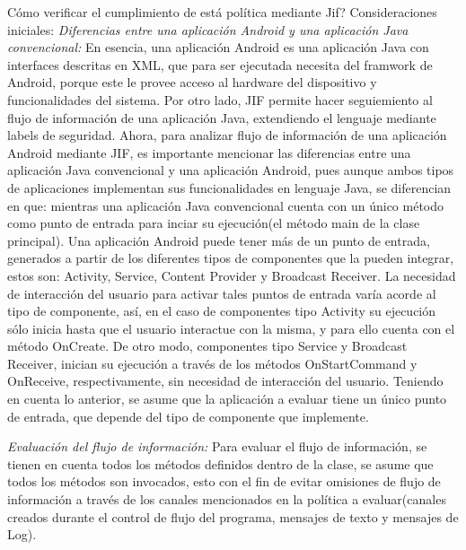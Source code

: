 Cómo verificar el cumplimiento de está política mediante
Jif?\newline
Consideraciones iniciales:\newline
\textit{Diferencias entre una aplicación Android y una aplicación Java
convencional:}\newline 
En esencia, una aplicación Android es una aplicación Java con interfaces
descritas en XML, que para ser ejecutada necesita del framwork de Android,
porque este le provee acceso al hardware del dispositivo y funcionalidades del
sistema.\newline 
Por otro lado, JIF permite hacer seguiemiento al flujo de información de una
aplicación Java, extendiendo el lenguaje mediante labels de seguridad.\newline
Ahora, para analizar flujo de información de una aplicación Android mediante
JIF, es importante mencionar las diferencias entre una aplicación Java convencional y
una aplicación Android, pues aunque ambos tipos de aplicaciones implementan sus
funcionalidades en lenguaje Java, se diferencian  en que: mientras una
aplicación Java convencional cuenta con un único método como punto de entrada
para inciar su ejecución(el método main de la clase principal). Una aplicación
Android puede tener más de un punto de entrada, generados a partir de los
diferentes tipos de componentes que la pueden integrar, estos son: Activity,
Service, Content Provider y Broadcast Receiver. La necesidad de interacción del
usuario para activar tales puntos de entrada varía acorde al tipo de
componente, así, en el caso de componentes tipo Activity su ejecución sólo
inicia hasta que el usuario interactue con la misma, y para ello cuenta con el
método OnCreate. De otro modo, componentes tipo Service y Broadcast Receiver,
inician su ejecución a través de los métodos OnStartCommand y OnReceive,
respectivamente, sin necesidad de interacción del usuario.\newline
{ \color{red} {Teniendo en cuenta lo anterior, se asume que la aplicación a
evaluar tiene un único punto de entrada, que depende del tipo de componente que
implemente.} }

\textit{Evaluación del flujo de información:}\newline
Para evaluar el flujo de información, se tienen en cuenta todos los métodos
definidos dentro de la clase, se asume que todos los métodos son invocados, esto
con el fin de evitar omisiones de flujo de información a través de los canales
mencionados en la política a evaluar(canales creados durante el control de flujo
del programa, mensajes de texto y mensajes de Log).

